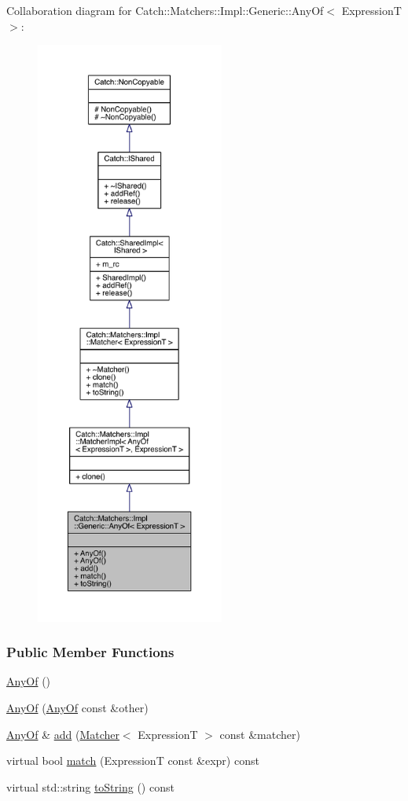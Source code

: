 Collaboration diagram for Catch\+:\+:Matchers\+:\+:Impl\+:\+:Generic\+:\+:Any\+Of$<$ Expression\+T $>$\+:\nopagebreak
\begin{figure}[H]
\begin{center}
\leavevmode
\includegraphics[height=550pt]{a00346}
\end{center}
\end{figure}
\subsubsection*{Public Member Functions}
\begin{DoxyCompactItemize}
\item 
\hyperlink{a00002_a131d84740c6b250ff7ef2213ae0de2aa}{Any\+Of} ()
\item 
\hyperlink{a00002_a74fbc05b32d334fcbfd0fae0163a404e}{Any\+Of} (\hyperlink{a00002}{Any\+Of} const \&other)
\item 
\hyperlink{a00002}{Any\+Of} \& \hyperlink{a00002_a3bce94b627551e5f96c5f9c6060413f0}{add} (\hyperlink{a00047}{Matcher}$<$ Expression\+T $>$ const \&matcher)
\item 
virtual bool \hyperlink{a00002_a2f97a08338e12deba541043a57d73db9}{match} (Expression\+T const \&expr) const 
\item 
virtual std\+::string \hyperlink{a00002_a7ecc6ec08b2018a643923a9d450aa328}{to\+String} () const 
\end{DoxyCompactItemize}
